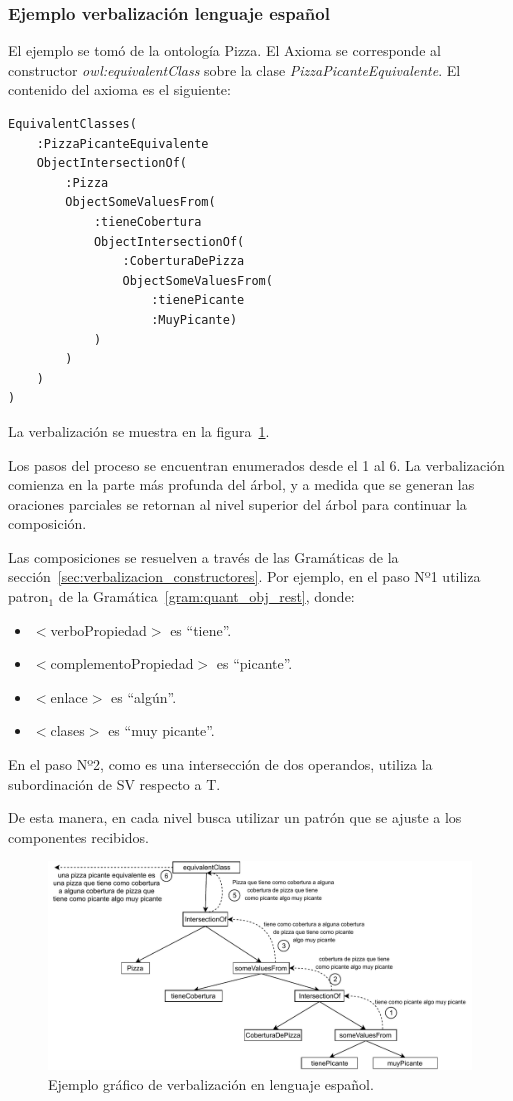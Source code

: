\subsubsection{Ejemplo verbalización lenguaje español}
El ejemplo se tomó de la ontología Pizza. El Axioma se corresponde al constructor \emph{owl:equivalentClass} sobre la clase \emph{PizzaPicanteEquivalente}. El contenido del axioma es el siguiente: 
\begin{verbatim}
EquivalentClasses(
    :PizzaPicanteEquivalente
    ObjectIntersectionOf(
        :Pizza
        ObjectSomeValuesFrom(
            :tieneCobertura
            ObjectIntersectionOf(
                :CoberturaDePizza
                ObjectSomeValuesFrom(
                    :tienePicante
                    :MuyPicante)
            )
        )
    )
)    
\end{verbatim}
La verbalización se muestra en la figura~\ref{fig:ejemplo_verb_espaniol}.

Los pasos del proceso se encuentran enumerados desde el 1 al 6. La verbalización comienza en la parte más profunda del árbol, y a medida que se generan las oraciones parciales se retornan al nivel superior del árbol para continuar la composición.

Las composiciones se resuelven a través de las Gramáticas de la sección~\ref{sec:verbalizacion_constructores}. Por ejemplo, en el paso Nº1 utiliza patron$_1$ de la Gramática~\ref{gram:quant_obj_rest}, donde:
\begin{itemize}
    \item $<$verboPropiedad$>$ es ``tiene''.
    \item $<$complementoPropiedad$>$ es ``picante''.
    \item $<$enlace$>$ es ``algún''.
    \item $<$clases$>$ es ``muy picante''.
\end{itemize}

En el paso Nº2, como es una intersección de dos operandos, utiliza la subordinación de SV respecto a T.

De esta manera, en cada nivel busca utilizar un patrón que se ajuste a los componentes recibidos.

\begin{figure}
    \centering
    \includegraphics[width=\textwidth]{img/generacion_documento/verbalizacion_equivalentClass_spanish.pdf}
    \caption{Ejemplo gráfico de verbalización en lenguaje español.}
    \label{fig:ejemplo_verb_espaniol}
\end{figure}

